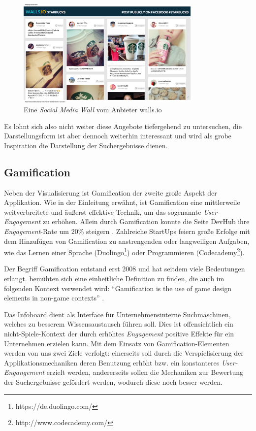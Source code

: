 \documentclass[12pt,twoside]{book}
\begin{document}
\begin{figure}[htbp]
    \centering
    \includegraphics[width=0.8\textwidth]{images/Starbucks.png}
    \caption{Eine \textit{Social Media Wall} vom Anbieter walls.io \cite{wallsio}}\label{fig:socialwall}
\end{figure}

Es lohnt sich also nicht weiter diese Angebote tiefergehend zu untersuchen, die Darstellungsform ist aber dennoch weiterhin interessant und wird als grobe Inspiration die Darstellung der Suchergebnisse dienen.


\subsection {Gamification}\label{sec:intro_game}

Neben der Visualisierung ist Gamification der zweite große Aspekt der Applikation. Wie in der Einleitung erwähnt, ist Gamification eine mittlerweile weitverbreitete und äußerst effektive Technik, um das sogenannte \textit{User-Engagement} zu erhöhen. Allein durch Gamification konnte die Seite DevHub ihre \textit{Engagement}-Rate um 20\% steigern \citep[pp. 17]{zichermann2011gamification}. Zahlreiche StartUps feiern große Erfolge mit dem Hinzufügen von Gamification zu anstrengenden oder langweiligen Aufgaben, wie das Lernen einer Sprache (Duolingo\footnote{https://de.duolingo.com/}) oder Programmieren (Codecademy\footnote{http://www.codecademy.com/}).

Der Begriff Gamification entstand erst 2008 und hat seitdem viele Bedeutungen erlangt. \citep{deterding2011game} bemühten sich eine einheitliche Definition zu finden, die auch im folgenden Kontext verwendet wird: ``Gamification is the use of game design elements in non-game contexts'' \citep{deterding2011game}.

Das Infoboard dient als Interface für Unternehmensinterne Suchmaschinen, welches zu besserem Wissensaustausch führen soll. Dies ist offensichtlich ein nicht-Spiele-Kontext der durch erhöhtes \textit{Engagement} positive Effekte für ein Unternehmen erzielen kann.
Mit dem Einsatz von Gamification-Elementen werden von uns zwei Ziele verfolgt: einerseits soll durch die Verspielisierung der Applikationsmechaniken deren Benutzung erhöht bzw. ein konstanteres \textit{User-Engangement} erzielt werden, andererseits sollen die Mechaniken zur Bewertung der Suchergebnisse gefördert werden, wodurch diese noch besser werden.
\end{document}
